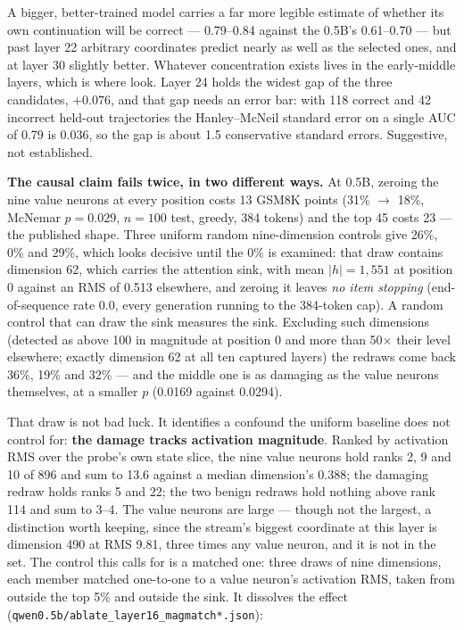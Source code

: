 \documentclass[11pt]{article}
\newcommand{\code}[1]{\texttt{#1}}
\begin{document}
A bigger, better-trained model carries a far more legible estimate of whether its own continuation will be correct --- 0.79--0.84 against the 0.5B's 0.61--0.70 --- but past layer 22 arbitrary coordinates predict nearly as well as the selected ones, and at layer 30 slightly better. Whatever concentration exists lives in the early-middle layers, which is where \citet{xu2026valueneurons} look. Layer 24 holds the widest gap of the three candidates, $+0.076$, and that gap needs an error bar: with 118 correct and 42 incorrect held-out trajectories the Hanley--McNeil standard error on a single AUC of 0.79 is 0.036, so the gap is about 1.5 conservative standard errors. Suggestive, not established.

\textbf{The causal claim fails twice, in two different ways.} At 0.5B, zeroing the nine value neurons at every position costs 13 GSM8K points (31\% $\to$ 18\%, McNemar $p = 0.029$, $n = 100$ test, greedy, 384 tokens) and the top 45 costs 23 --- the published shape. Three uniform random nine-dimension controls give 26\%, 0\% and 29\%, which looks decisive until the 0\% is examined: that draw contains dimension 62, which carries the attention sink, with mean $|h| = 1{,}551$ at position 0 against an RMS of 0.513 elsewhere, and zeroing it leaves \emph{no item stopping} (end-of-sequence rate 0.0, every generation running to the 384-token cap). A random control that can draw the sink measures the sink. Excluding such dimensions (detected as above 100 in magnitude at position 0 and more than 50$\times$ their level elsewhere; exactly dimension 62 at all ten captured layers) the redraws come back 36\%, 19\% and 32\% --- and the middle one is as damaging as the value neurons themselves, at a smaller $p$ (0.0169 against 0.0294).

That draw is not bad luck. It identifies a confound the uniform baseline does not control for: \textbf{the damage tracks activation magnitude}. Ranked by activation RMS over the probe's own state slice, the nine value neurons hold ranks 2, 9 and 10 of 896 and sum to 13.6 against a median dimension's 0.388; the damaging redraw holds ranks 5 and 22; the two benign redraws hold nothing above rank 114 and sum to 3--4. The value neurons are large --- though not the largest, a distinction worth keeping, since the stream's biggest coordinate at this layer is dimension 490 at RMS 9.81, three times any value neuron, and it is not in the set. The control this calls for is a matched one: three draws of nine dimensions, each member matched one-to-one to a value neuron's activation RMS, taken from outside the top 5\% and outside the sink. It dissolves the effect (\code{qwen0.5b/ablate\_layer16\_magmatch*.json}):
\end{document}
